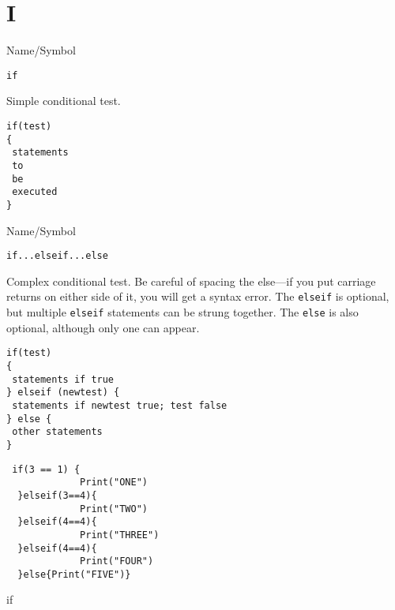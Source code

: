 \rl


\section{I}
\rl


\begin{desc}{Name/Symbol}
\item[Name/Symbol]	\verb+if+ 

\item[Description]	Simple conditional test.

\item[Usage]
\begin{verbatim}
if(test)
{
 statements
 to
 be 
 executed
}
\end{verbatim}

\item[Example]	

\item[See Also]	
\end{desc}

\rl




\begin{desc}{Name/Symbol}
\item[Name/Symbol]	\verb+if...elseif...else+            

\item[Description] Complex conditional test.  Be careful of spacing
  the else---if you put carriage returns on either side of it, you
  will get a syntax error. The \verb+elseif+ is optional, but
  multiple \verb+elseif+ statements can be strung together.  The
  \verb+else+ is also optional, although only one can appear.

\item[Usage]
\begin{verbatim}
if(test)
{
 statements if true
} elseif (newtest) {
 statements if newtest true; test false
} else {
 other statements
} 
\end{verbatim}

\item[Example]	
\begin{verbatim}
 if(3 == 1) {
             Print("ONE")
  }elseif(3==4){
             Print("TWO")
  }elseif(4==4){
             Print("THREE")
  }elseif(4==4){
             Print("FOUR")
  }else{Print("FIVE")}
\end{verbatim}
\item[See Also]	
if
\end{desc}

